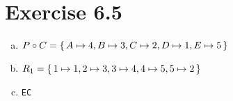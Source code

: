 \documentclass{article} %
\newcommand{\homeworkNumber}{6}
\begin{document}
\section*{Exercise \homeworkNumber.5}

\begin{enumerate}[a)]

\item $ P \circ C = \set{A \mapsto 4, B \mapsto 3, C \mapsto 2, D \mapsto 1, E \mapsto 5}$

\item $ R_1 = \set{1 \mapsto 1, 2 \mapsto 3, 3 \mapsto 4, 4 \mapsto 5, 5 \mapsto 2} $

\item \verb|EC|



\end{enumerate}
\end{document}
